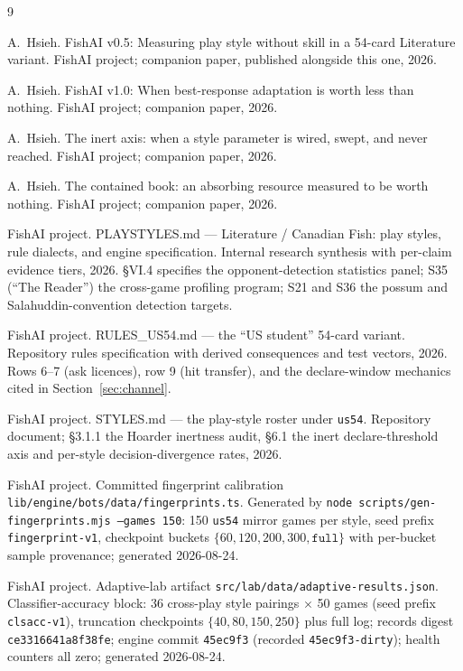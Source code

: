 \documentclass[11pt]{article}
\newcommand{\code}[1]{\texttt{#1}}
\newcommand{\usff}{\code{us54}}
\begin{document}
\begin{thebibliography}{9}
\small

A.~Hsieh.
\newblock FishAI v0.5: Measuring play style without skill in a 54-card Literature variant.
\newblock FishAI project; companion paper, published alongside this one, 2026.

A.~Hsieh.
\newblock FishAI v1.0: When best-response adaptation is worth less than nothing.
\newblock FishAI project; companion paper, 2026.

A.~Hsieh.
\newblock The inert axis: when a style parameter is wired, swept, and never reached.
\newblock FishAI project; companion paper, 2026.

A.~Hsieh.
\newblock The contained book: an absorbing resource measured to be worth nothing.
\newblock FishAI project; companion paper, 2026.

FishAI project.
\newblock PLAYSTYLES.md --- Literature / Canadian Fish: play styles, rule dialects, and
engine specification.
\newblock Internal research synthesis with per-claim evidence tiers, 2026. \S VI.4 specifies
the opponent-detection statistics panel; S35 (``The Reader'') the cross-game profiling
program; S21 and S36 the possum and Salahuddin-convention detection targets.

FishAI project.
\newblock RULES\_US54.md --- the ``US student'' 54-card variant.
\newblock Repository rules specification with derived consequences and test vectors, 2026.
Rows 6--7 (ask licences), row 9 (hit transfer), and the declare-window mechanics cited in
Section~\ref{sec:channel}.

FishAI project.
\newblock STYLES.md --- the play-style roster under \usff{}.
\newblock Repository document; \S3.1.1 the Hoarder inertness audit, \S6.1 the inert
declare-threshold axis and per-style decision-divergence rates, 2026.

FishAI project.
\newblock Committed fingerprint calibration \code{lib/engine/bots/data/fingerprints.ts}.
\newblock Generated by \code{node scripts/gen-fingerprints.mjs --games 150}: 150 \usff{}
mirror games per style, seed prefix \code{fingerprint-v1}, checkpoint buckets
$\{60, 120, 200, 300, \code{full}\}$ with per-bucket sample provenance; generated
2026-08-24.

FishAI project.
\newblock Adaptive-lab artifact \code{src/lab/data/adaptive-results.json}.
\newblock Classifier-accuracy block: 36 cross-play style pairings $\times$ 50 games (seed
prefix \code{clsacc-v1}), truncation checkpoints $\{40, 80, 150, 250\}$ plus full log;
records digest \code{ce3316641a8f38fe}; engine commit \code{45ec9f3} (recorded
\code{45ec9f3-dirty}); health counters all zero; generated 2026-08-24.


\end{thebibliography}
\end{document}
